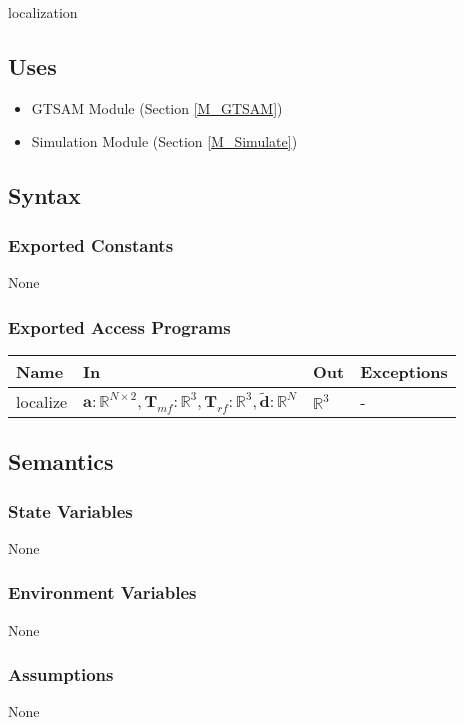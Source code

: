 \documentclass[12pt, titlepage]{article}
\begin{document}
localization

\subsection{Uses}
\begin{itemize}
  \item GTSAM Module (Section \ref{M_GTSAM})
  \item Simulation Module (Section \ref{M_Simulate})
  
\end{itemize}
\subsection{Syntax}

\subsubsection{Exported Constants}
None

\subsubsection{Exported Access Programs}

\begin{center}
\begin{tabular}{p{2cm} p{7cm} p{4cm} p{3cm}}
\hline
\textbf{Name} & \textbf{In} & \textbf{Out} & \textbf{Exceptions} \\
\hline
localize & $\mathbf{a}:\mathbb{R}^{N \times 2}, \mathbf{T}_{mf}:\mathbb{R}^3, \mathbf{T}_{rf}: \mathbb{R}^3,\mathbf{\tilde{d}}:\mathbb{R}^N$ & $\mathbb{R}^3$ & - \\
\hline
\end{tabular}
\end{center}

\subsection{Semantics}

\subsubsection{State Variables}
None

\subsubsection{Environment Variables}
None

\subsubsection{Assumptions}
None
\end{document}
